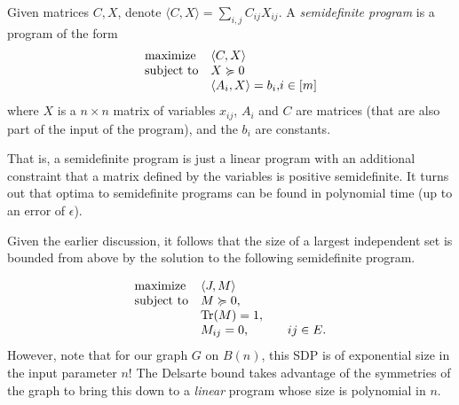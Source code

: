 	\begin{fdef}
		Given matrices $C,X$, denote $\langle C,X\rangle = \sum_{i,j} C_{ij} X_{ij}$. A \emph{semidefinite program} is a program of the form
		\[
		\label{def:sdp}
		\begin{array}{ll@{}ll}
		\text{maximize}  & \displaystyle\langle C,X\rangle &\\
		\text{subject to} \displaystyle &X \pge 0  &\\
		& \displaystyle \langle A_i,X\rangle = b_i, & i \in [m]
		\end{array}
		\]
		where $X$ is a $n \times n$ matrix of variables $x_{ij}$, $A_i$ and $C$ are matrices (that are also part of the input of the program), and the $b_i$ are constants.
	\end{fdef}
	That is, a semidefinite program is just a linear program with an additional constraint that a matrix defined by the variables is positive semidefinite. It turns out that optima to semidefinite programs can be found in polynomial time (up to an error of $\epsilon$).

	Given the earlier discussion, it follows that the size of a largest independent set is bounded from above by the solution to the following semidefinite program.

	\begin{equation}
		\label{indep-sdp}
		\begin{array}{ll@{}ll}
		\text{maximize}  & \displaystyle  \langle J,M\rangle &\\
		\text{subject to} \displaystyle & M \pge 0, &\\
		& \displaystyle \Tr(M) = 1, & \\
		& M_{ij} = 0, & \qquad ij \in E.
		\end{array}
	\end{equation}
	However, note that for our graph $G$ on $B(n)$, this SDP is of exponential size in the input parameter $n$! The Delsarte bound takes advantage of the symmetries of the graph to bring this down to a \emph{linear} program whose size is polynomial in $n$.\\

